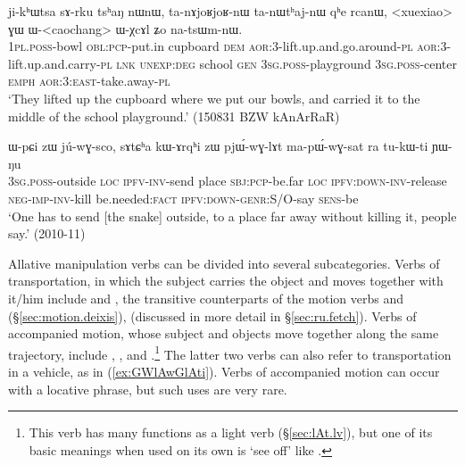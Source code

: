 \begin{exe}
\ex \label{ex:WXcAl.Zo.natsWmnW}
\gll ji-kʰɯtsa sɤ-rku tsʰaŋ nɯnɯ, ta-nɤjoʁjoʁ-nɯ ta-nɯtʰaj-nɯ qʰe rcanɯ, <xuexiao> ɣɯ ɯ-<caochang> ɯ-χcɤl ʑo na-tsɯm-nɯ. \\
\textsc{1pl}.\textsc{poss}-bowl \textsc{obl}:\textsc{pcp}-put.in cupboard \textsc{dem} \textsc{aor}:3\flobv{}-lift.up.and.go.around-\textsc{pl} \textsc{aor}:3\flobv{}-lift.up.and.carry-\textsc{pl} \textsc{lnk} \textsc{unexp}:\textsc{deg} school \textsc{gen} \textsc{3sg}.\textsc{poss}-playground \textsc{3sg}.\textsc{poss}-center \textsc{emph} \textsc{aor}:3\flobv{}:\textsc{east}-take.away-\textsc{pl} \\
\glt `They lifted up the cupboard where we put our bowls, and carried it to the middle of the school playground.' (150831 BZW kAnArRaR)
\end{exe} 

\begin{exe}
\ex \label{ex:WpCi.zW.juwGsco}
\gll  ɯ-pɕi zɯ jú-wɣ-sco, sɤtɕʰa kɯ-ɤrqʰi zɯ pjɯ́-wɣ-lɤt ma-pɯ́-wɣ-sat ra tu-kɯ-ti ɲɯ-ŋu \\
\textsc{3sg}.\textsc{poss}-outside \textsc{loc} \textsc{ipfv}-\textsc{inv}-send place \textsc{sbj}:\textsc{pcp}-be.far \textsc{loc} \textsc{ipfv}:\textsc{down}-\textsc{inv}-release \textsc{neg}-\textsc{imp}-\textsc{inv}-kill be.needed:\textsc{fact} \textsc{ipfv}:\textsc{down}-\textsc{genr}:S/O-say \textsc{sens}-be \\
\glt `One has to send [the snake] outside, to a place far away without killing it, people say.'  (2010-11)
\end{exe} 

Allative manipulation verbs can be divided into several subcategories. Verbs of transportation, in which the subject carries the object and moves together with it/him include  and , the transitive counterparts of the motion verbs  and  (§\ref{sec:motion.deixis}),  (discussed in more detail in §\ref{sec:ru.fetch}). Verbs of accompanied motion, whose subject and objects move together along the same trajectory, include , ,  and .\footnote{This verb has many functions as a light verb (§\ref{sec:lAt.lv}), but one of its basic meanings when used on its own is `see off' like .} The latter two verbs can also refer to transportation in a vehicle, as in (\ref{ex:GWlAwGlAti}). Verbs of accompanied motion can occur with a locative phrase, but such uses are very rare.  


